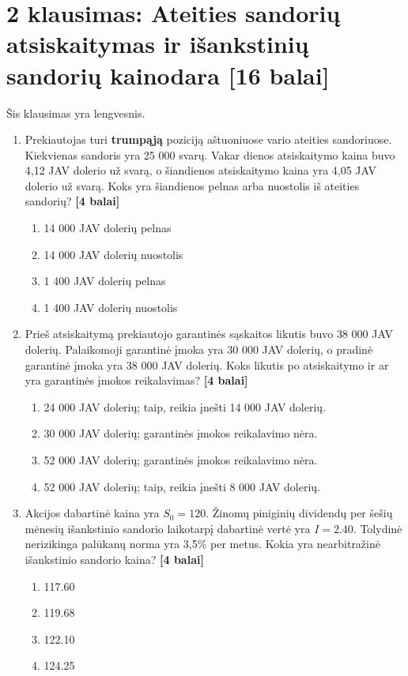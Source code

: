 \documentclass[11pt]{article}
\newcommand{\pts}[1]{\hspace{0.35em}\textnormal{\textbf{[#1 balai]}}}
\newenvironment{choices}{\begin{enumerate}[label=\Alph*.,leftmargin=2.2em,itemsep=0.12em,topsep=0.12em]}{\end{enumerate}}
\begin{document}
\section*{2 klausimas: Ateities sandorių atsiskaitymas ir išankstinių sandorių kainodara \pts{16}}

Šis klausimas yra lengvesnis.

\begin{enumerate}
    \item Prekiautojas turi \textbf{trumpąją} poziciją aštuoniuose vario ateities
    sandoriuose. Kiekvienas sandoris yra 25 000 svarų. Vakar dienos atsiskaitymo
    kaina buvo 4,12 JAV dolerio už svarą, o šiandienos atsiskaitymo kaina yra
    4,05 JAV dolerio už svarą. Koks yra šiandienos pelnas arba nuostolis iš
    ateities sandorių? \pts{4}
    \begin{choices}
        \item 14 000 JAV dolerių pelnas
        \item 14 000 JAV dolerių nuostolis
        \item 1 400 JAV dolerių pelnas
        \item 1 400 JAV dolerių nuostolis
    \end{choices}

    \item Prieš atsiskaitymą prekiautojo garantinės sąskaitos likutis buvo
    38 000 JAV dolerių. Palaikomoji garantinė įmoka yra 30 000 JAV dolerių, o
    pradinė garantinė įmoka yra 38 000 JAV dolerių. Koks likutis po atsiskaitymo
    ir ar yra garantinės įmokos reikalavimas? \pts{4}
    \begin{choices}
        \item 24 000 JAV dolerių; taip, reikia įnešti 14 000 JAV dolerių.
        \item 30 000 JAV dolerių; garantinės įmokos reikalavimo nėra.
        \item 52 000 JAV dolerių; garantinės įmokos reikalavimo nėra.
        \item 52 000 JAV dolerių; taip, reikia įnešti 8 000 JAV dolerių.
    \end{choices}

    \item Akcijos dabartinė kaina yra $S_0=120$. Žinomų piniginių dividendų per
    šešių mėnesių išankstinio sandorio laikotarpį dabartinė vertė yra $I=2.40$.
    Tolydinė nerizikinga palūkanų norma yra 3,5\% per metus. Kokia yra
    nearbitražinė išankstinio sandorio kaina? \pts{4}
    \begin{choices}
        \item 117.60
        \item 119.68
        \item 122.10
        \item 124.25
    \end{choices}


\end{enumerate}
\end{document}
